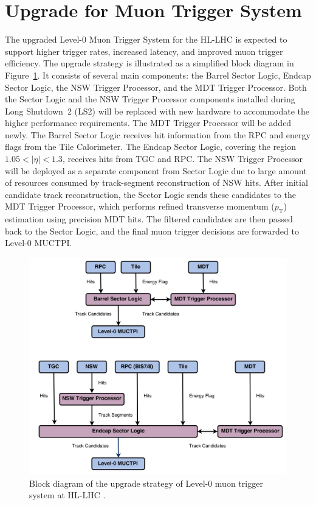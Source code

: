 \section{Upgrade for Muon Trigger System} \label{sec:MuonTriggerUpgrade}
The upgraded Level-0 Muon Trigger System for the HL-LHC is expected to support higher trigger rates, increased latency, and improved muon trigger efficiency. The upgrade strategy is illustrated as a simplified block diagram in Figure~\ref{fig:muon_trigger_upgrade}. It consists of several main components: the Barrel Sector Logic, Endcap Sector Logic, the NSW Trigger Processor, and the MDT Trigger Processor. Both the Sector Logic and the NSW Trigger Processor components installed during Long Shutdown~2 (LS2) will be replaced with new hardware to accommodate the higher performance requirements. The MDT Trigger Processor will be added newly. The Barrel Sector Logic receives hit information from the RPC and energy flags from the Tile Calorimeter. The Endcap Sector Logic, covering the region $1.05 < |\eta| < 1.3$, receives hits from TGC and RPC. The NSW Trigger Processor will be deployed as a separate component from Sector Logic due to large amount of resources consumed by track-segment reconstruction of NSW hits. After initial candidate track reconstruction, the Sector Logic sends these candidates to the MDT Trigger Processor, which performs refined transverse momentum ($p_\mathrm{T}$) estimation using precision MDT hits. The filtered candidates are then passed back to the Sector Logic, and the final muon trigger decisions are forwarded to Level-0 MUCTPI.

\begin{figure}[htbp]
  \centering
  \includegraphics[width=1.0\textwidth]{figs/chapter2/muon_trigger_upgrade.png}
  \caption{Block diagram of the upgrade strategy of Level-0 muon trigger system at HL-LHC \cite{TDAQ_TDR}.}
  \label{fig:muon_trigger_upgrade}
\end{figure}
